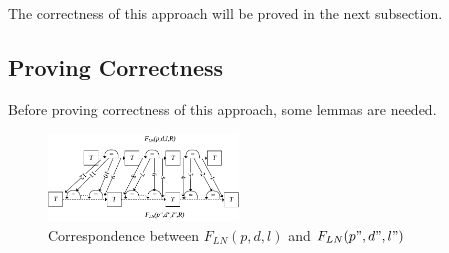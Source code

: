 \documentclass[journal]{IEEEtran}
\begin{document}
The correctness of this approach will be proved in the next subsection.




\subsection{Proving Correctness}

Before proving correctness of this approach,
some lemmas are needed.
\begin{figure}[b]
\centering
\includegraphics[width=0.45\textwidth]{doubleloop_unfold_cmp}
\caption{Correspondence between $F_{LN}(p,d,l)$ and $F_{LN}(p",d",l")$}
\label{doubleloop_unfold_cmp}
\end{figure}
\end{document}
